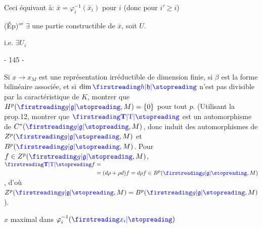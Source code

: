 Ceci équivaut  à: $\bar x=\varphi_i^{-1}(\bar x_i)$ pour $i$   (donc pour $i'\geq i$)

(Ép)$'''$ $\exists$ une partie constructible   de $\bar x$, soit $U$.

i.e. $\exists U_i$

\begin{center}- 145 -\end{center}

Si $x\longrightarrow x_M$ est une représentation irréductible de dimension finie, si $\beta$ est la forme bilinéaire associée, et si $\dim\unsure{h|\mathfrak h}$ n'est pas divisible par la caractéristique de $K$, montrer que $H^p(\unsure{g|\mathfrak g},M)=\{0\}$ pour tout $p$. (Utilisant la prop.12, montrer que $\unsure{\mathbf T|\mathrm T}$ est un automorphisme de $C^*(\unsure{g|\mathfrak g},M)$, donc induit des automorphismes de $Z^p(\unsure{g|\mathfrak g},M)$ et $B^p(\unsure{g|\mathfrak g},M)$. Pour $f\in Z^p(\unsure{g|\mathfrak g},M)$, $\begin{aligned}\unsure{\mathbf T|\mathrm T}f&=\\&=(d\rho+\rho d)f=d\rho f\in B^p(\unsure{g|\mathfrak g},M)\end{aligned}$, d'où $Z^p(\unsure{g|\mathfrak g},M)=B^p(\unsure{g|\mathfrak g},M)$).

$x$ maximal dans $\varphi_i^{-1}(\unsure{x_i})$



